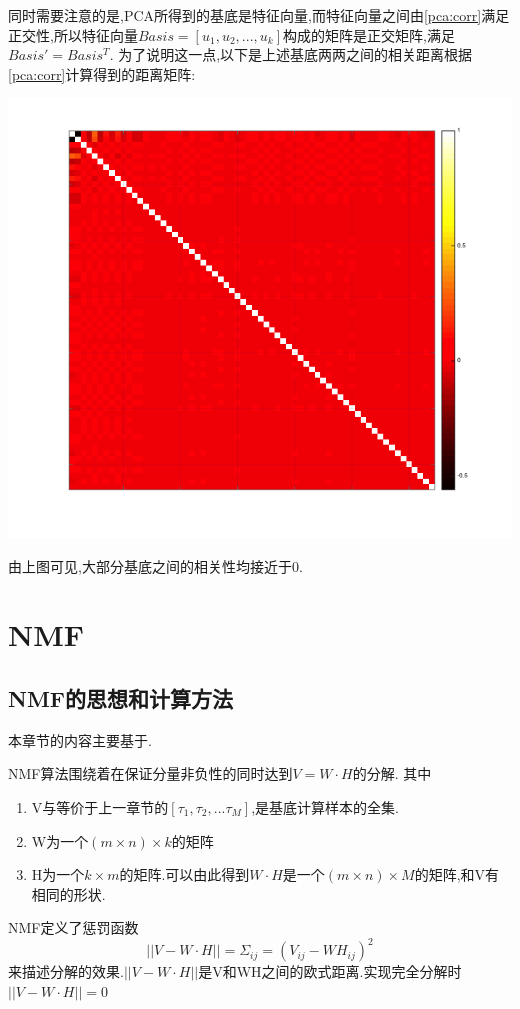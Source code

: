 同时需要注意的是,PCA所得到的基底是特征向量,而特征向量之间由\ref{pca:corr}满足正交性,所以特征向量$Basis = [u_1,u_2,...,u_k]$构成的矩阵是正交矩阵,满足$Basis' = Basis^T$. 为了说明这一点,以下是上述基底两两之间的相关距离根据\ref{pca:corr}计算得到的距离矩阵:
\begin{center}
\begin{minipage}[t]{\linewidth}
\center
{
\includegraphics[width=\textwidth]{Img/pca_correlation.png} 
}
\end{minipage}
\medskip
\end{center}
由上图可见,大部分基底之间的相关性均接近于0.

\section{NMF}

\subsection{NMF的思想和计算方法}
本章节的内容主要基于\cite{lee1999learning, lee2001algorithms}.\newline

NMF算法围绕着在保证分量非负性的同时达到$V=W \cdot H$的分解.
	其中
	\begin{enumerate}
		\item V与等价于上一章节的$[\tau_1, \tau_2,...\tau_M]$,是基底计算样本的全集.
		\item W为一个$(m \times n) \times k$的矩阵
		\item H为一个$k \times m$的矩阵.可以由此得到$W \cdot H$是一个$(m \times n) \times M$的矩阵,和V有相同的形状.
	\end{enumerate}
 NMF定义了惩罚函数\begin{equation}
 \label{nmf_cost} ||V-W\cdot H|| = \Sigma_{ij} = (V_{ij} - WH_{ij})^2\end{equation}来描述分解的效果.$||V-W\cdot H||$是V和WH之间的欧式距离.实现完全分解时$||V-W\cdot H||=0$


